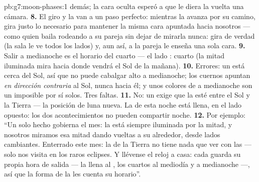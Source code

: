 \begin{solution}{pb:g7:moon-phases:1}
demás; la cara oculta esperó a que le diera la vuelta una cámara.
\textbf{8.} El giro y la  van a un paso perfecto: mientras la
 avanza por su camino, gira justo lo necesario para mantener la
misma cara apuntada hacia nosotros --- como quien baila rodeando a su
pareja sin dejar de mirarla nunca: gira de verdad (la sala le ve todos
los lados) y, aun así, a la pareja le enseña una sola cara.
\textbf{9.} Salir a medianoche es el horario del cuarto  ---
el lado : cuarto  (la mitad iluminada mira hacia
donde vendrá el Sol de la mañana).
\textbf{10.} Errores: un  está cerca del Sol, así que no
puede cabalgar alto a medianoche; los cuernos apuntan \emph{en
dirección contraria} al Sol, nunca hacia él; y unos colores de
 a medianoche son un imposible por sí solos. Tres faltas.
\textbf{11.} No: un  exige que la  esté entre el
Sol y la Tierra --- la posición de luna nueva. La  de esta noche
está llena, en el lado opuesto: los dos acontecimientos no pueden
compartir noche.
\textbf{12.} Por ejemplo: ``Un solo hecho gobierna el mes: la
 está siempre iluminada por la mitad, y nosotros miramos esa
mitad dando vueltas a su alrededor, desde lados cambiantes. Enterrado
este mes: la  de la Tierra no tiene nada que ver con las
 --- solo nos visita en los raros eclipses. Y llévense el reloj
a casa: cada  guarda su propia hora de salida --- la llena al
, los cuartos al mediodía y a medianoche ---, así que la
forma de la  les cuenta su horario''.
\end{solution}
